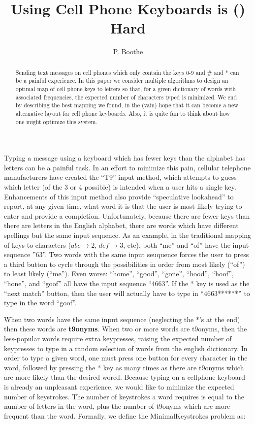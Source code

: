 \documentclass{article}
\title{Using Cell Phone Keyboards is (\NP) Hard}
\author{P. Boothe}
\newcommand{\newword}[1]{{\bf #1}}
\begin{document}
\maketitle

\begin{abstract}
Sending text messages on cell phones which only contain the keys 0-9 and \#
and * can be a painful experience.  In this paper we
consider multiple algorithms to design an optimal map of cell phone keys to
letters so that, for a given dictionary of words with associated frequencies,
the expected number of characters typed is minimized.  We end by describing the
best mapping we found, in the (vain) hope that it can become a new alternative
layout for cell phone keyboards.  Also, it is quite fun to think about how one
might optimize this system.
\end{abstract}


Typing a message using a keyboard which has fewer keys than the alphabet has
letters can be a painful task.  In an effort to minimize this pain, cellular
telephone manufacturers have created the ``T9'' input method, which attempts to
guess which letter (of the 3 or 4 possible) is intended when a user hits a
single key.  Enhancements of this input method also provide ``speculative
lookahead'' to report, at any given time, what word it is that the user is
most likely trying to enter and provide a completion.  Unfortunately, because there are fewer keys than there are letters in the English alphabet, there are words which have different spellings but the same input sequence.  As an example, in the traditional mapping of keys to characters ($abc\to 2$, $def\to3$, etc), both ``me'' and ``of'' have the input sequence ''63''.  Two words with the same input seuquence forces the user to press a third button to cycle through the possibilities in order from most likely (``of'') to least likely (``me'').  Even worse: ``home'', ``good'', ``gone'', ``hood'', ``hoof'', ``hone'', and ``goof'' all have the input sequence ``4663''.  If the * key is used as the ``next match'' button, then the user will actually have to type in ``4663******'' to type in the word ``goof''.

When two words have the same input sequence (neglecting the *'s at the end) then these words are \newword{t9onyms}.  When two or more words are t9onyms, then the less-popular words require extra keypresses, raising the expected number of keypresses to type in a random selection of words from the english dictionary.  In order to type a given word, one must press one button for every character in the word, followed by pressing the * key as many times as there are t9onyms which are more likely than the desired wored.  Because typing on a cellphone keyboard is already an unpleasant experience, we would like to minimize the expected number of keystrokes.  The number of keystrokes a word requires is equal to the number of letters in the word, plus the number of t9onyms which are more frequent than the word.  Formally, we define the {\sc MinimalKeystrokes} problem as:
\end{document}
